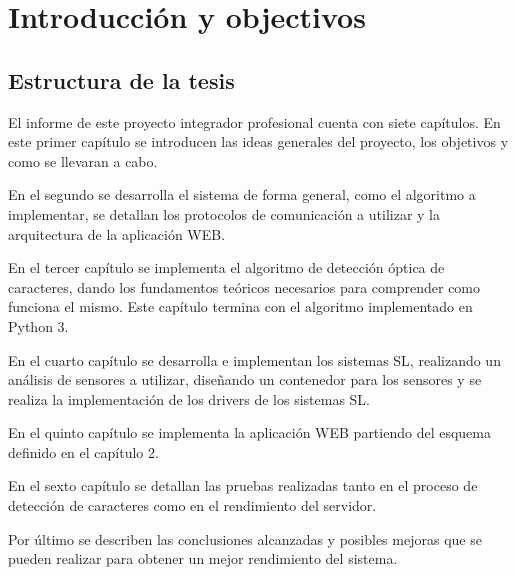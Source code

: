 \chapter{Introducción y objectivos}





\section{Estructura de la tesis}

El informe de este proyecto integrador profesional cuenta con siete capítulos. En este primer capítulo se introducen las ideas generales del proyecto, los objetivos y como se llevaran a cabo.

En el segundo se desarrolla el sistema de forma general, como el algoritmo a implementar, se detallan los protocolos de comunicación a utilizar y la arquitectura de la aplicación WEB.

En el tercer capítulo se implementa el algoritmo de detección óptica de caracteres, dando los fundamentos teóricos necesarios para comprender como funciona el mismo. Este capítulo termina con el algoritmo implementado en Python 3.

En el cuarto capítulo se desarrolla e implementan los sistemas SL, realizando un análisis de sensores a utilizar, diseñando un contenedor para los sensores y se realiza la implementación de los drivers de los sistemas SL.

En el quinto capítulo se implementa la aplicación WEB partiendo del esquema definido en el capítulo 2.

En el sexto capítulo se detallan las pruebas realizadas tanto en el proceso de detección de caracteres como en el rendimiento del servidor.

Por último se describen las conclusiones alcanzadas y posibles mejoras que se pueden realizar para obtener un mejor rendimiento del sistema.